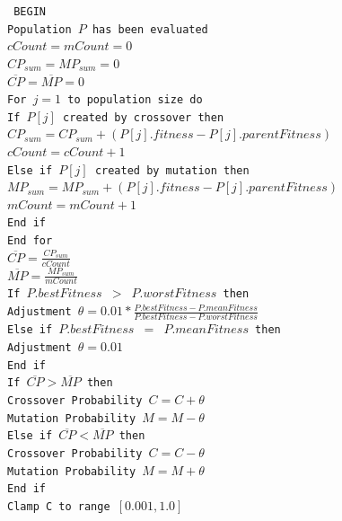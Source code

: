 \begin{figure}[htbp]
\begin{center}
\begin{varwidth}{\textwidth}
{\tt
BEGIN \\
\tab Population $P$ has been evaluated \\
\tab $cCount = mCount = 0$ \\
\tab $CP_{sum} = MP_{sum} = 0$ \\
\tab $\overline{CP} = \overline{MP} = 0$ \\
\tab For $j=1$ to population size do \\
\tab \tab If $P[j]$ created by crossover then \\
\tab \tab \tab $CP_{sum} = CP_{sum} + (P[j].fitness - P[j].parentFitness)$ \\
\tab \tab \tab $cCount = cCount + 1$\\
\tab \tab Else if $P[j]$ created by mutation then\\
\tab \tab \tab $MP_{sum} = MP_{sum} + (P[j].fitness - P[j].parentFitness)$ \\
\tab \tab \tab $mCount = mCount + 1$ \\
\tab \tab End if \\
\tab End for \\
\tab $\overline{CP} = \frac{CP_{sum}}{cCount}$ \\
\tab $\overline{MP} = \frac{MP_{sum}}{mCount}$ \\
\tab If $P.bestFitness$ $>$ $P.worstFitness$ then \\
\tab \tab Adjustment $\theta = 0.01 * \frac{P.bestFitness - P.meanFitness}{P.bestFitness - P.worstFitness}$ \\
\tab Else if $P.bestFitness$ $=$ $P.meanFitness$ then \\
\tab \tab Adjustment $\theta = 0.01$ \\
\tab End if \\
\tab If $\overline{CP} > \overline{MP}$ then \\
\tab \tab Crossover Probability $C = C + \theta$ \\
\tab \tab Mutation Probability $M = M - \theta$ \\
\tab Else if $\overline{CP} < \overline{MP}$ then \\
\tab \tab Crossover Probability $C = C - \theta$ \\
\tab \tab Mutation Probability $M = M + \theta$ \\
\tab End if \\
\tab Clamp C to range $[0.001,1.0]$ \\
}
\end{varwidth}
\end{center}
\end{figure}
